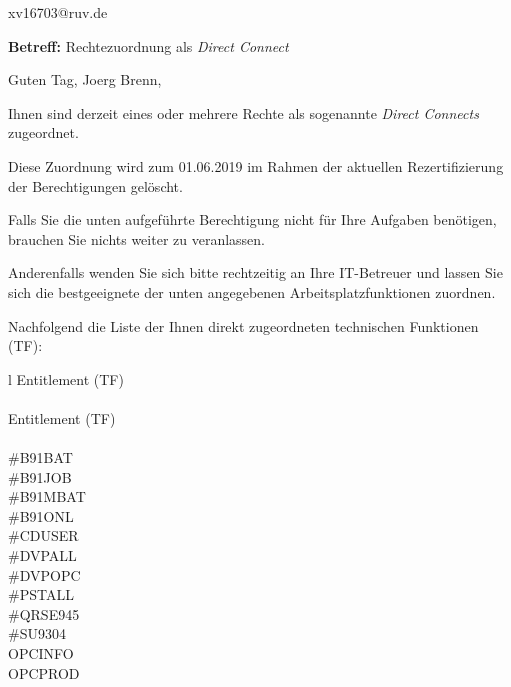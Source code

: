 \documentclass[a4paper,landscape,12pt]{letter}
\begin{document}
\begin{letter}{xv16703@ruv.de\hfill \break}
\begin{normalsize}
	\opening{\textbf{Betreff:} Rechtezuordnung als \emph{Direct Connect}}
	\begin{normalsize} \hfill
	\end{normalsize}

	\begin{normalsize}
		Guten Tag, 
	Joerg Brenn, \hfill \break
	\end{normalsize}
	\end{normalsize}
	
\begin{normalsize}
	Ihnen sind derzeit eines oder mehrere Rechte als sogenannte \emph{Direct Connects} zugeordnet.
	
	Diese Zuordnung wird zum 01.06.2019 im Rahmen der aktuellen Rezertifizierung der Berechtigungen gelöscht.
	
	Falls Sie die unten aufgeführte Berechtigung nicht für Ihre Aufgaben benötigen, 
	brauchen Sie nichts weiter zu veranlassen.
	
	Anderenfalls wenden Sie sich bitte rechtzeitig an Ihre IT-Betreuer 
	und lassen Sie sich die bestgeeignete der unten angegebenen Arbeitsplatzfunktionen zuordnen.
	\end{normalsize}
	
\begin{normalsize}
	Nachfolgend die Liste der Ihnen direkt zugeordneten technischen Funktionen (TF):

	\begin{longtable}{l}
		Entitlement (TF) \\ \hline
		\endfirsthead
		\\\hline
		Entitlement (TF) \\ \hline
		\endhead %
		\multicolumn{1}{r@{}}{Fortsetzung \ldots}\\
		\endfoot
		\hline
		\endlastfoot
	\#B91BAT\\\#B91JOB\\\#B91MBAT\\\#B91ONL\\\#CDUSER\\\#DVPALL\\\#DVPOPC\\\#PSTALL\\\#QRSE945\\\#SU9304\\OPCINFO\\OPCPROD\\
	\end{longtable}
	\end{normalsize}
	

\end{letter}
\end{document}
